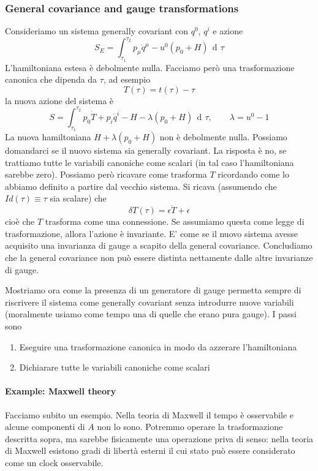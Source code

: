 \documentclass[a4paper, 11pt]{article}
\newcommand{\dd}{\mathop{\mathrm{d}\!}{}}
\begin{document}
	\subsubsection{General covariance and gauge transformations}
	Consideriamo un sistema generally covariant con $q^0$, $q^i$ e azione
	\begin{equation*}
	S_E = \int_{\tau_1}^{\tau_2} p_\mu\dot{q}^\mu - u^0(p_0+H)\, \dd \tau
	\end{equation*}
	L'hamiltoniana estesa è debolmente nulla. Facciamo però una trasformazione canonica che dipenda da $\tau$, ad esempio
	\begin{equation*}
	T(\tau) = t(\tau) -\tau
	\end{equation*}
	la nuova azione del sistema è
	\begin{equation*}
	S = \int_{\tau_1}^{\tau_2} p_0\dot{T} + p_i \dot{q}^i - H - \lambda(p_0+H)\, \dd \tau,\qquad \lambda = u^0-1
	\end{equation*}
	La nuova hamiltoniana $H+\lambda(p_0+H)$ non è debolmente nulla. Possiamo domandarci se il nuovo sistema sia generally covariant. La risposta è no, se trattiamo tutte le variabili canoniche come scalari (in tal caso l'hamiltoniana sarebbe zero). Possiamo però ricavare come trasforma $T$ ricordando come lo abbiamo definito a partire dal vecchio sistema. Si ricava (assumendo che $Id(\tau)\equiv\tau$ sia scalare) che
	\begin{equation*}
	\delta T(\tau) = \epsilon \dot{T} + \epsilon
	\end{equation*}
	cioè che $T$ trasforma come una connessione. Se assumiamo questa come legge di trasformazione, allora l'azione è invariante. E' come se il nuovo sistema avesse acquisito una invarianza di gauge a scapito della general covariance. Concludiamo che la general covariance non può essere distinta nettamente dalle altre invarianze di gauge.
	
	Mostriamo ora come la presenza di un generatore di gauge permetta sempre di riscrivere il sistema come generally covariant senza introdurre nuove variabili (moralmente usiamo come tempo una di quelle che erano pura gauge). I passi sono
	\begin{enumerate}
		\item Eseguire una trasformazione canonica in modo da azzerare l'hamiltoniana
		\item Dichiarare tutte le variabili canoniche come scalari
	\end{enumerate}
	
	\paragraph{Example: Maxwell theory}
	Facciamo subito un esempio. Nella teoria di Maxwell il tempo è osservabile e alcune componenti di $A$ non lo sono. Potremmo operare
	la trasformazione descritta sopra, ma sarebbe fisicamente una operazione priva di senso: nella teoria di Maxwell esistono gradi di libertà esterni il cui stato può essere considerato come un clock osservabile.
	
\end{document}

